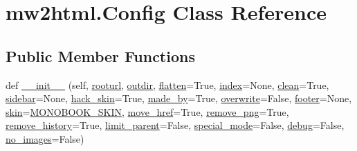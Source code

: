 \hypertarget{classmw2html_1_1_config}{}\section{mw2html.\+Config Class Reference}
\label{classmw2html_1_1_config}
\subsection*{Public Member Functions}
\begin{DoxyCompactItemize}
\item 
def \hyperlink{classmw2html_1_1_config_a1609bd276313ad49de96c458077682eb}{\+\_\+\+\_\+init\+\_\+\+\_\+} (self, \hyperlink{classmw2html_1_1_config_aeb12a940f1165d5abf67ba33dae59d28}{rooturl}, \hyperlink{classmw2html_1_1_config_ab1b06f551981590e3602ef342c9ec426}{outdir}, \hyperlink{classmw2html_1_1_config_a68f835fe25e82cb83acfa34d24ea5423}{flatten}=True, \hyperlink{classmw2html_1_1_config_a75776ea894bdbc698210723b6f8517fb}{index}=None, \hyperlink{classmw2html_1_1_config_ad74110e6433292bc02ca070147951816}{clean}=True, \hyperlink{classmw2html_1_1_config_a070def28f1e3b7098a17cd0ce75f92e0}{sidebar}=None, \hyperlink{classmw2html_1_1_config_ab8bf3cd002fbe3ea5ae9f2125726f298}{hack\+\_\+skin}=True, \hyperlink{classmw2html_1_1_config_a3058302a27e24f9c802abed872d87205}{made\+\_\+by}=True, \hyperlink{classmw2html_1_1_config_a43b87fc86f4db7b2a678aa9d4edcc487}{overwrite}=False, \hyperlink{classmw2html_1_1_config_ab13184eb1c700ebb989fa355221beb2d}{footer}=None, \hyperlink{classmw2html_1_1_config_a2f8db9afd3422531379dbb9795c595be}{skin}=\hyperlink{namespacemw2html_a0f008e4b1e0268f9ef3546e5a4cafc9b}{M\+O\+N\+O\+B\+O\+O\+K\+\_\+\+S\+K\+IN}, \hyperlink{classmw2html_1_1_config_ab99ad91cedaf94fb441d15ab539dee61}{move\+\_\+href}=True, \hyperlink{classmw2html_1_1_config_acdd599198ca8204d5e5054bb8195882a}{remove\+\_\+png}=True, \hyperlink{classmw2html_1_1_config_a98d73e496d59f4e522045095cf2e0f23}{remove\+\_\+history}=True, \hyperlink{classmw2html_1_1_config_a8fba2588992ef27b68cecd8b5aa9ee34}{limit\+\_\+parent}=False, \hyperlink{classmw2html_1_1_config_a873d1381c06bf818051740e91347054b}{special\+\_\+mode}=False, \hyperlink{classmw2html_1_1_config_a52d34b7b74e4216fdedb0db8d01b1ca2}{debug}=False, \hyperlink{classmw2html_1_1_config_a6965153fa13b111d48005ebea9e5db40}{no\+\_\+images}=False)
\end{DoxyCompactItemize}
